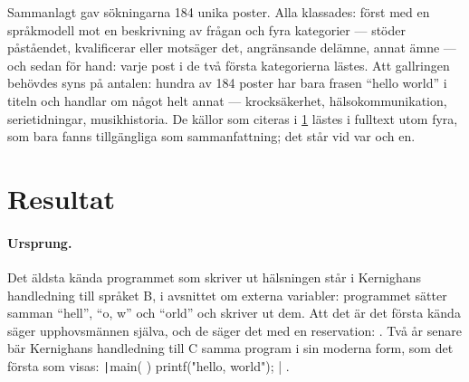 Sammanlagt gav sökningarna 184 unika poster.  Alla klassades: först med
en språkmodell mot en beskrivning av frågan och fyra kategorier --- stöder
påståendet, kvalificerar eller motsäger det, angränsande delämne, annat
ämne --- och sedan för hand: varje post i de två första kategorierna
lästes.  Att gallringen behövdes syns på antalen: hundra av 184 poster har
bara frasen \enquote{hello world} i titeln och handlar om något helt
annat --- krocksäkerhet, hälsokommunikation, serietidningar,
musikhistoria.  De källor som citeras i \cref{sec:hw-resultat} lästes i
fulltext utom fyra, som bara fanns tillgängliga som sammanfattning; det
står vid var och en.

\section{Resultat}
\label{sec:hw-resultat}

\paragraph{Ursprung.}  Det äldsta kända programmet som skriver ut
hälsningen står i Kernighans handledning till språket B, i avsnittet om
externa variabler: programmet sätter samman \enquote{hell}, \enquote{o,
w} och \enquote{orld} och skriver ut dem\autocite{Kernighan1973BTutorial}.
Att det är det första kända säger upphovsmännen själva, och de säger det
med en reservation: .  Två år senare bär Kernighans
handledning till C samma program i sin moderna form, som det första som
visas: \texttt|main( ) { printf("hello, world"); }|
\autocite{Kernighan1974CTutorial}.

